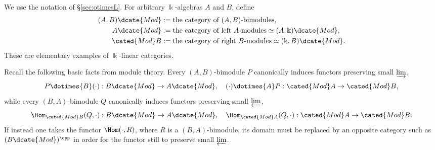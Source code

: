 We use the notation of \S\ref{sec:otimesL}. For arbitrary $\Bbbk$-algebras
$A$ and $B$, define
\begin{align*}
	(A, B)\dcate{Mod} & := \text{the category of $(A,B)$-bimodules}, \\
	A\dcate{Mod} & := \text{the category of left $A$-modules} \simeq (A, \Bbbk)\dcate{Mod}, \\
	\cated{Mod}B & := \text{the category of right $B$-modules} \simeq (\Bbbk, B)\dcate{Mod}.
\end{align*}
These are elementary examples of $\Bbbk$-linear categories.

Recall the following basic facts from module theory. Every $(A,B)$-bimodule
$P$ canonically induces functors preserving small $\varinjlim$,
\[ P \dotimes{B} (\cdot): B\dcate{Mod} \to A\dcate{Mod}, \quad (\cdot) \dotimes{A} P : \cated{Mod}A \to \cated{Mod}B, \]
while every $(B,A)$-bimodule $Q$ canonically induces functors preserving
small $\varprojlim$,
\[ \Hom_{\cated{Mod}B}(Q, \cdot): B\dcate{Mod} \to A\dcate{Mod}, \quad \Hom_{\cated{Mod}A}(Q, \cdot): \cated{Mod}A \to \cated{Mod}B. \]
If instead one takes the functor $\Hom(\mathord\cdot,R)$, where $R$ is a
$(B,A)$-bimodule, its domain must be replaced by an opposite category such
as $(B\dcate{Mod})^{\opp}$ in order for the functor still to preserve small
$\varprojlim$.

